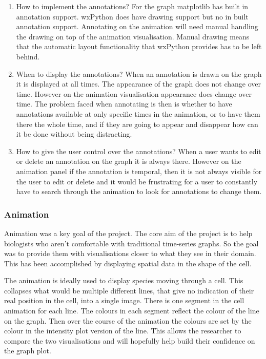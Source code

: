 \begin{enumerate}
\item How to implement the annotations?  For the graph matplotlib has built in annotation support.  wxPython does have drawing support but no in built annotation support.  Annotating on the animation will need manual handling the drawing on top of the animation visualisation.  Manual drawing means that the automatic layout functionality that wxPython provides has to be left behind.
\item When to display the annotations?  When an annotation is drawn on the graph it is displayed at all times.  The appearance of the graph does not change over time.  However on the animation visualisation appearance does change over time.  The problem faced when annotating is then is whether to have annotations available at only specific times in the animation, or to have them there the whole time, and if they are going to appear and disappear how can it be done without being distracting.
\item How to give the user control over the annotations? When a user wants to edit or delete an annotation on the graph it is always there.  However on the animation panel if the annotation is temporal, then it is not always visible for the user to edit or delete and it would be frustrating for a user to constantly have to search through the animation to look for annotations to change them.
\end{enumerate}

\subsubsection{Animation}

Animation was a key goal of the project.  The core aim of the project is to help biologists who aren't comfortable with traditional time-series graphs.  So the goal was to provide them with visualisations closer to what they see in their domain.  This has been accomplished by displaying spatial data in the shape of the cell.

The animation is ideally used to display species moving through a cell.  This collapses what would be multiple different lines, that give no indication of their real position in the cell, into a single image.  There is one segment in the cell animation for each line.  The colours in each segment reflect the colour of the line on the graph.  Then over the course of the animation the colours are set by the colour in the intensity plot version of the line.  This allows the researcher to compare the two visualisations and will hopefully help build their confidence on the graph plot.

